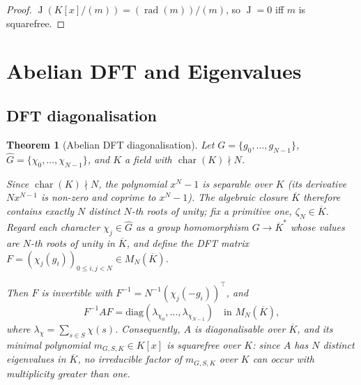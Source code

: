 \documentclass[12pt]{amsart}
\numberwithin{equation}{section}
\theoremstyle{plain}
\newtheorem{theorem}{Theorem}[section]
\theoremstyle{definition}
\DeclareMathOperator{\Jac}{J}
\DeclareMathOperator{\rad}{rad}
\DeclareMathOperator{\ch}{char}
\newcommand{\Ghat}{\widehat{G}}
\begin{document}
\begin{proof}
$\Jac(K[x]/(m)) = (\rad(m))/(m)$, so $\Jac = 0$ iff $m$ is squarefree.
\end{proof}

\section{Abelian DFT and Eigenvalues}
\label{sec:dft}

\subsection{DFT diagonalisation}

\begin{theorem}[Abelian DFT diagonalisation]
\label{thm:dft}
Let $G = \{g_0, \ldots, g_{N-1}\}$, $\Ghat = \{\chi_0, \ldots, \chi_{N-1}\}$,
and $K$ a field with $\ch(K) \nmid N$.

Since $\ch(K) \nmid N$, the polynomial $x^N - 1$ is separable over $K$
(its derivative $N x^{N-1}$ is non-zero and coprime to $x^N - 1$).
The algebraic closure $\overline{K}$ therefore contains exactly $N$ distinct
$N$-th roots of unity; fix a primitive one, $\zeta_N \in \overline{K}$.
Regard each character $\chi_j \in \Ghat$ as a group homomorphism
$G \to \overline{K}^*$ whose values are $N$-th roots of unity in $\overline{K}$,
and define the \emph{DFT matrix}
$F = (\chi_j(g_i))_{0 \le i,j < N} \in M_N(\overline{K})$.

Then $F$ is invertible with
$F^{-1} = N^{-1}(\chi_j(-g_i))^\top$, and
\begin{equation}
\label{eq:Fdiag}
  F^{-1} A F = \mathrm{diag}(\lambda_{\chi_0}, \ldots, \lambda_{\chi_{N-1}})
  \quad \text{in } M_N(\overline{K}),
\end{equation}
where $\lambda_\chi = \sum_{s \in S} \chi(s)$.
Consequently, $A$ is diagonalisable over $\overline{K}$, and its minimal
polynomial $m_{G,S,K} \in K[x]$ is squarefree over $K$: since $A$ has $N$
distinct eigenvalues in $\overline{K}$, no irreducible factor of $m_{G,S,K}$
over $K$ can occur with multiplicity greater than one.
\end{theorem}
\end{document}
